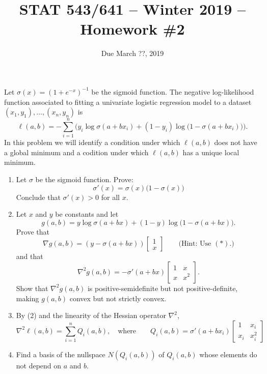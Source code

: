 \documentclass[12pt]{amsart}
\begin{document}
\title{STAT 543/641 -- Winter 2019 -- Homework \#2}

\author{Due March ??, 2019}
\maketitle

Let $\sigma(x)=(1+e^{-x})^{-1}$ be the sigmoid function.
The negative log-likelihood function associated to fitting a univariate logistic regression model to a
dataset $(x_1, y_1),\ldots,(x_n, y_n)$ is
\[
    \ell(a,b) = -\sum_{i=1}^n\Big(y_i\log\sigma(a + bx_i)
    + (1-y_i)\log\big(1-\sigma(a + bx_i)\big)\Big).
\]
In this problem we will identify a condition under which $\ell(a,b)$
does not have a global minimum and a codition under which $\ell(a,b)$ has a unique local minimum.
\begin{enumerate}\setlength\itemsep{1em}
    \item Let $\sigma$ be the sigmoid function.
    Prove: 
    \[
        \sigma'(x) = \sigma(x)\big(1-\sigma(x)\big)\tag{$*$}
    \]
    Conclude that $\sigma'(x)>0$ for all $x$.

    \item Let $x$ and $y$ be constants and let
    \[
        g(a, b) = y\log\sigma(a + bx) + (1-y)\log\big(1-\sigma(a + bx)\big).
    \]
    Prove that
    \[
        \nabla g(a,b) = (y-\sigma(a + bx))\begin{bmatrix}1\\x\end{bmatrix}
            \qquad \text{(Hint: Use $(*)$.)}
    \]
    and that
    \[
        \nabla^2g(a,b) = -\sigma'(a+bx)\begin{bmatrix}
            1 & x\\
            x & x^2
        \end{bmatrix}.
    \]
    Show that $\nabla^2 g(a,b)$ is positive-semidefinite but not positive-definite,
    making $g(a,b)$ convex but not strictly convex.

    \item By (2) and the linearity of the Hessian operator $\nabla^2$,
    \[
        \nabla^2 \ell(a,b) = \sum_{i=1}^n Q_i(a,b),\quad\text{where}\qquad
        Q_i(a,b) = \sigma'(a+bx_i)\begin{bmatrix}
            1 & x_i\\
            x_i & x_i^2
        \end{bmatrix}
    \]

    \item Find a basis of the nullspace $N(Q_i(a,b))$ of $Q_i(a,b)$ whose elements do not depend on $a$ and $b$.
    

\end{enumerate}
\end{document}
